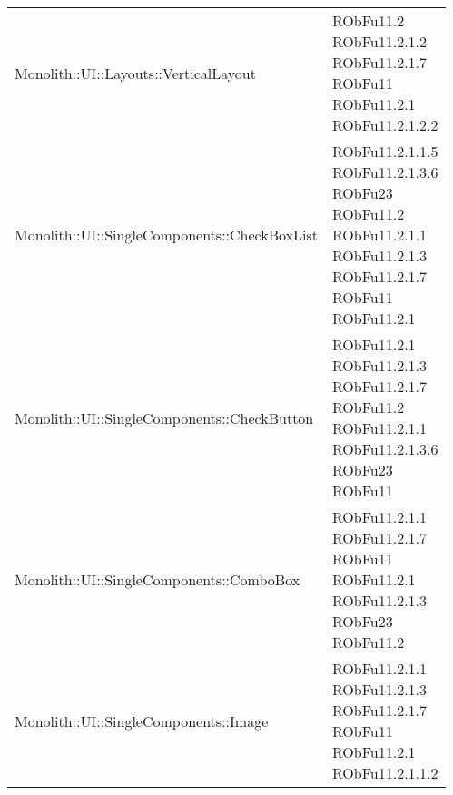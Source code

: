 \begin{center}
\begin{longtable}{|
*{1}{>{\centering\arraybackslash}m{7.5cm}|}
*{1}{>{\centering\arraybackslash}m{2.5cm}|}}
{\\RObFu11.2
\\RObFu11.2.1.2
\\RObFu11.2.1.7
\\}\\\hline
Monolith::UI::Layouts::VerticalLayout & \makecell{RObFu11.2
\\RObFu11.2.1.2
\\RObFu11.2.1.7
\\RObFu11
\\RObFu11.2.1
\\RObFu11.2.1.2.2
\\}\\\hline
Monolith::UI::SingleComponents::CheckBoxList & \makecell{RObFu11.2.1.1.5
\\RObFu11.2.1.3.6
\\RObFu23
\\RObFu11.2
\\RObFu11.2.1.1
\\RObFu11.2.1.3
\\RObFu11.2.1.7
\\RObFu11
\\RObFu11.2.1
\\}\\\hline
Monolith::UI::SingleComponents::CheckButton & \makecell{RObFu11.2.1
\\RObFu11.2.1.3
\\RObFu11.2.1.7
\\RObFu11.2
\\RObFu11.2.1.1
\\RObFu11.2.1.3.6
\\RObFu23
\\RObFu11
\\}\\\hline
Monolith::UI::SingleComponents::ComboBox & \makecell{RObFu11.2.1.1
\\RObFu11.2.1.7
\\RObFu11
\\RObFu11.2.1
\\RObFu11.2.1.3
\\RObFu23
\\RObFu11.2
\\}\\\hline
Monolith::UI::SingleComponents::Image & \makecell{RObFu11.2.1.1
\\RObFu11.2.1.3
\\RObFu11.2.1.7
\\RObFu11
\\RObFu11.2.1
\\RObFu11.2.1.1.2
}
\end{longtable}
\end{center}
